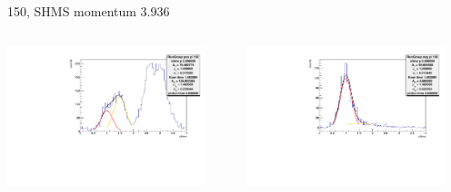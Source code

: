\documentclass[aspectratio=169,xcolor=dvipsnames]{beamer}
\begin{document}
\begin{frame}{150, SHMS momentum 3.936}
\begin{columns}
\begin{column}[T]{0.5\textwidth}
\includegraphics[width = 0.9\textwidth]{results/pid/rftime/rftime_pos_150.pdf}
\end{column}
\begin{column}[T]{0.5\textwidth}
\includegraphics[width = 0.9\textwidth]{results/pid/rftime/rftime_neg_150.pdf}
\end{column}
\end{columns}
\end{frame}
\end{document}
